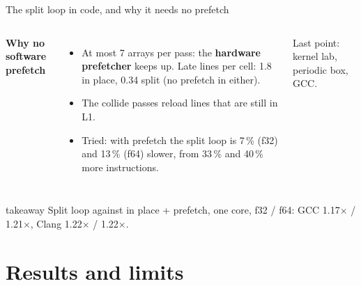 \documentclass[aspectratio=169,10pt,t]{beamer}
\newcommand{\sx}[1]{#1\ensuremath{\times}} %
\newcommand{\term}[1]{\textcolor{psblue!85!black}{\textbf{#1}}} %
\newcommand{\takeaway}[1]{\par\vfill
  \begin{beamercolorbox}[wd=\textwidth,sep=4pt,rounded=true]{takeaway}
    \small #1
  \end{beamercolorbox}}
\begin{document}
\begin{frame}{The split loop in code, and why it needs no prefetch}
  \begin{columns}[T,onlytextwidth]
    \vspace{0.5mm}
    
    \vspace{1mm}
    {\small\bfseries Why no software prefetch\par}
    \vspace{1mm}
    \begin{itemize}\small
      \item At most 7 arrays per pass: the \term{hardware prefetcher} keeps up. Late lines per cell:
            1.8 in place, 0.34 split (no prefetch in either).
      \item The collide passes reload lines that are still in L1.
      \item Tried: with prefetch the split loop is 7\,\% (f32) and 13\,\% (f64) slower, from 33\,\% and
            40\,\% more instructions.
    \end{itemize}
    \vspace{1mm}
    {\scriptsize\color{psgray}Last point: kernel lab, periodic box, GCC.\par}
  \end{columns}
  \takeaway{Split loop against in place + prefetch, one core, f32 / f64: GCC \sx{1.17} / \sx{1.21}, Clang \sx{1.22} / \sx{1.22}.}
\end{frame}

\section{Results and limits}
\end{document}
